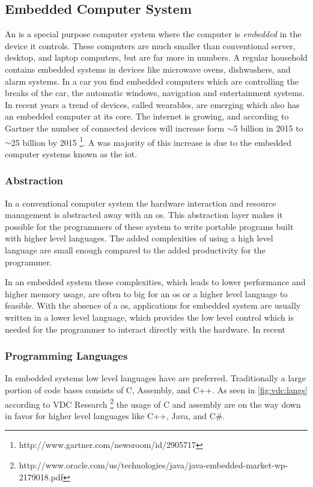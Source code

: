 
\subsection{Embedded Computer System}
An  is a special purpose computer system where the computer is \emph{embedded} in the device it controls.
These computers are much smaller than conventional server, desktop, and laptop computers, but are far more in numbers.
A regular household contains embedded systems in devices like microwave ovens, dishwashers, and alarm systems.
In a car you find embedded computers which are controlling the breaks of the car, the automatic windows, navigation and entertainment systems.
In recent years a trend of devices, called wearables, are emerging which also has an embedded computer at its core.
The internet is growing, and according to Gartner the number of connected devices will increase form $\sim$5 billion in 2015 to $\sim$25 billion by 2015 \footnote{http://www.gartner.com/newsroom/id/2905717}.
A was majority of this increase is due to the embedded computer systems known as the \gls{iot}.

\subsubsection{Abstraction}
In a conventional computer system the hardware interaction and resource management is abstracted away with an \gls{os}.
This abstraction layer makes it possible for the programmers of these system to write portable programs built with higher level languages.
The added complexities of using a high level language are small enough compared to the added productivity for the programmer.

In an embedded system these complexities, which leads to lower performance and higher memory usage, are often to big for an \gls{os} or a higher level language to feasible.
With the absence of a \gls{os}, applications for embedded system are usually written in a lower level language, which provides the low level control which is needed for the programmer to interact directly with the hardware.
In recent

\subsubsection{Programming Languages}

In embedded systems low level languages have are preferred.
Traditionally a large portion of code bases consists of C, Assembly, and C++.
As seen in \autoref{fig:vdc:langs} according to VDC Research \footnote{http://www.oracle.com/us/technologies/java/java-embedded-market-wp-2179018.pdf} the usage of C and assembly are on the way down in favor for higher level languages like C++, Java, and C\#.

